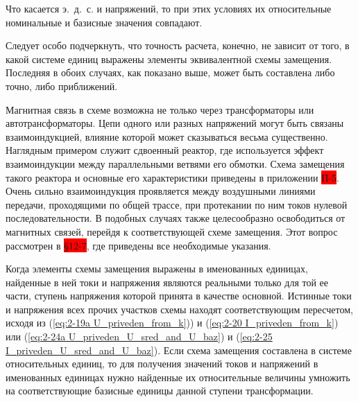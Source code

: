 Что касается э.~д.~с. и напряжений, то при этих условиях их относительные номинальные и базисные значения совпадают.

Следует особо подчеркнуть, что точность расчета, конечно, не зависит от того, в какой системе единиц выражены элементы эквивалентной схемы замещения. Последняя в обоих случаях, как показано выше, может быть составлена либо точно, либо приближений.

Магнитная связь в схеме возможна не только через трансформаторы или автотрансформаторы. Цепи одного или разных напряжений могут быть связаны взаимоиндукцией, влияние которой может сказываться весьма существенно. Наглядным примером служит сдвоенный реактор, где используется эффект взаимоиндукции между параллельными ветвями его обмотки. Схема замещения такого реактора и основные его характеристики приведены в приложении \colorbox{red}{П-5}. Очень сильно взаимоиндукция проявляется между воздушными линиями передачи, проходящими по общей трассе, при протекании по ним токов нулевой последовательности. В подобных случаях также целесообразно освободиться от магнитных связей, перейдя к соответствующей схеме замещения. Этот вопрос рассмотрен в \colorbox{red}{§12-7}, где приведены все необходимые указания.

Когда элементы схемы замещения выражены в именованных единицах, найденные в ней токи и напряжения являются реальными только для той ее части, ступень напряжения которой принята в качестве основной. Истинные токи и напряжения всех прочих участков схемы находят соответствующим пересчетом, исходя из (\ref{eq:2-19a U_priveden_from_k})) и (\ref{eq:2-20 I_priveden_from_k}) или (\ref{eq:2-24a U_priveden_U_sred_and_U_baz}) и (\ref{eq:2-25 I_priveden_U_sred_and_U_baz}). Если схема замещения составлена в системе относительных единиц, то для получения значений токов и напряжений в именованных единицах нужно найденные их относительные величины умножить на соответствующие базисные единицы данной ступени трансформации.

\addtocounter{example}{1}

